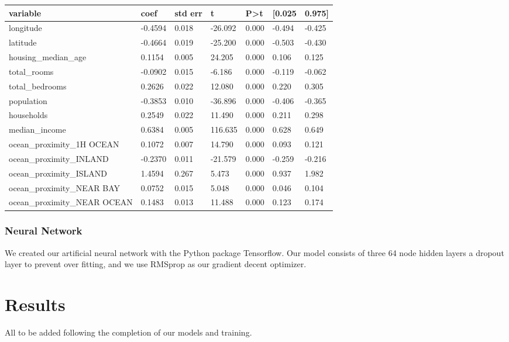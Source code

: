 \documentclass[11pt]{article}
\begin{document}
\begin{table}[b]
\centering
\begin{tabular}{|l|l|l|l|l|l|l|} 
\hline
\textbf{variable} & \textbf{coef} & \textbf{std err} & \textbf{t} & \textbf{P\textgreater{}\textbar{}t\textbar{}} & \textbf{[0.025} & \textbf{0.975]} \\ 
\hline
longitude & -0.4594 & 0.018 & -26.092 & 0.000 & -0.494 & -0.425 \\ 
\hline
latitude & -0.4664 & 0.019 & -25.200 & 0.000 & -0.503 & -0.430 \\ 
\hline
housing\_median\_age & 0.1154 & 0.005 & 24.205 & 0.000 & 0.106 & 0.125 \\ 
\hline
total\_rooms & -0.0902 & 0.015 & -6.186 & 0.000 & -0.119 & -0.062 \\ 
\hline
total\_bedrooms & 0.2626 & 0.022 & 12.080 & 0.000 & 0.220 & 0.305 \\ 
\hline
population & -0.3853 & 0.010 & -36.896 & 0.000 & -0.406 & -0.365 \\ 
\hline
households & 0.2549 & 0.022 & 11.490 & 0.000 & 0.211 & 0.298 \\ 
\hline
median\_income & 0.6384 & 0.005 & 116.635 & 0.000 & 0.628 & 0.649 \\ 
\hline
ocean\_proximity\_1H OCEAN & 0.1072 & 0.007 & 14.790 & 0.000 & 0.093 & 0.121 \\ 
\hline
ocean\_proximity\_INLAND & -0.2370 & 0.011 & -21.579 & 0.000 & -0.259 & -0.216 \\ 
\hline
ocean\_proximity\_ISLAND & 1.4594 & 0.267 & 5.473 & 0.000 & 0.937 & 1.982 \\ 
\hline
ocean\_proximity\_NEAR BAY & 0.0752 & 0.015 & 5.048 & 0.000 & 0.046 & 0.104 \\ 
\hline
ocean\_proximity\_NEAR OCEAN & 0.1483 & 0.013 & 11.488 & 0.000 & 0.123 & 0.174 \\
\hline
\end{tabular}
\end{table}

\subsubsection{Neural Network}

We created our artificial neural network with the Python package Tensorflow. Our model consists of three 64 node hidden layers a dropout layer to prevent over fitting, and we use RMSprop as our gradient decent optimizer. 

\section{Results}
All to be added following the completion of our models and training.
\end{document}

